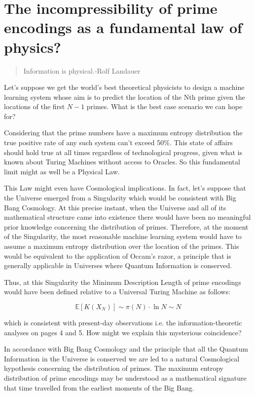 \documentclass{article}
\begin{document}
\section{The incompressibility of prime encodings as a fundamental law of physics?}

\begin{quote}
Information is physical.-Rolf Landauer	
\end{quote}

Let's suppose we get the world's best theoretical physicists to design a machine learning system whose aim is to predict the location of the Nth prime given the locations of the first $N-1$ primes. What is the best case scenario we can hope for? 

Considering that the prime numbers have a maximum entropy distribution the true positive rate of any such system can't exceed 50\%. This state of affairs should hold true at all times regardless of technological progress, given what is known about Turing Machines without access to Oracles. So this fundamental limit might as well be a Physical Law. 

This Law might even have Cosmological implications. In fact, let's suppose that the Universe emerged from a Singularity which would be consistent with Big Bang Cosmology. At this precise instant, when the Universe and all of its mathematical structure came into existence there would have been no meaningful prior knowledge concerning the distribution of primes. Therefore, at the moment of the Singularity, the most reasonable machine learning system would have to assume a maximum entropy distribution over the location of the primes. This would be equivalent to the application of Occam's razor, a principle that is generally applicable in Universes where Quantum Information is conserved. 

Thus, at this Singularity the Minimum Description Length of prime encodings would have been defined relative to a Universal Turing Machine as follows: 

\begin{equation}
\mathbb{E}[K(X_N)] \sim \pi(N) \cdot \ln N \sim N	
\end{equation}

which is consistent with present-day observations i.e. the information-theoretic analyses on pages 4 and 5. How might we explain this mysterious coincidence? 

In accordance with Big Bang Cosmology and the principle that all the Quantum Information in the Universe is conserved we are led to a natural Cosmological hypothesis concerning the distribution of primes. The maximum entropy distribution of prime encodings may be understood as a mathematical signature that time travelled from the earliest moments of the Big Bang. 
\end{document}
